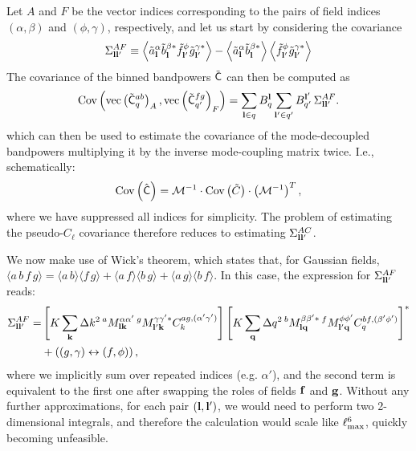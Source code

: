 \documentclass[a4paper,11pt]{article}
\newcommand{\summ}[1]{\sum_{\bf #1}\Delta #1^2}
\begin{document}
      Let $A$ and $F$ be the vector indices corresponding to the pairs of
      field indices $(\alpha,\beta)$ and $(\phi,\gamma)$, respectively, and let us start by considering the covariance
      \begin{equation}
        \Sigma^{AF}_{{\bf l}{\bf l}'}\equiv\left\langle\tilde{a}^\alpha_{\bf l}\tilde{b}^{\beta *}_{\bf l}\tilde{f}^\phi_{{\bf l}'}\tilde{g}^{\gamma *}_{{\bf l}'}\right\rangle-\left\langle\tilde{a}^\alpha_{\bf l}\tilde{b}^{\beta *}_{\bf l}\right\rangle\left\langle\tilde{f}^\phi_{{\bf l}'}\tilde{g}^{\gamma *}_{{\bf l}'}\right\rangle
      \end{equation}
      The covariance of the binned bandpowers $\tilde{\sf C}$ can then be computed as
      \begin{equation}\label{eq:cov_binned}
        {\rm Cov}\left({\rm vec}\left(\tilde{\sf C}^{ab}_q\right)_A,{\rm vec}\left(\tilde{\sf C}^{fg}_{q'}\right)_F\right)=\sum_{{\bf l}\in q} B^{\bf l}_q\sum_{{\bf l}'\in q'} B^{{\bf l}'}_{q'}\,\Sigma^{AF}_{{\bf l}{\bf l}'}.
      \end{equation}
      which can then be used to estimate the covariance of the mode-decoupled bandpowers multiplying it by the inverse mode-coupling matrix twice. I.e., schematically:
      \begin{equation}
        {\rm Cov}\left(\hat{\sf C}\right)=\mathcal{M}^{-1}\cdot{\rm Cov}\left(\tilde{C}\right)\cdot\left(\mathcal{M}^{-1}\right)^{T},
      \end{equation}
      where we have suppressed all indices for simplicity. The problem of estimating the pseudo-$C_\ell$ covariance therefore reduces to estimating $\Sigma^{AC}_{{\bf l}{\bf l}'}$.
    
      We now make use of Wick's theorem, which states that, for Gaussian fields, $\langle a\,b\,f\,g\rangle=\langle a\,b\rangle\langle f\,g\rangle+\langle a\,f\rangle\langle b\,g\rangle+\langle a\,g\rangle\langle b\,f\rangle$. In this case, the expression for $\Sigma^{AF}_{{\bf l}{\bf l'}}$ reads:
      \begin{align}\nonumber
        \Sigma^{AF}_{{\bf l}{\bf l}'}=&\left[K\summ{k}\,^aM^{\alpha\alpha'}_{{\bf l}{\bf k}}\,^gM^{\gamma\gamma'*}_{{\bf l}'{\bf k}}C^{ag,(\alpha'\gamma')}_k\right]\left[K\summ{q}\,^bM^{\beta\beta'*}_{{\bf l}{\bf q}}\,^fM^{\phi\phi'}_{{\bf l}'{\bf q}}C^{bf,(\beta'\phi')}_q\right]^*\\\label{eq:covar_general}
        &+\left((g,\gamma)\leftrightarrow(f,\phi)\right),
      \end{align}
      where we implicitly sum over repeated indices (e.g. $\alpha'$), and the second term is equivalent to the first one after swapping the roles of fields ${\bf f}$ and ${\bf g}$. Without any further approximations, for each pair $({\bf l},{\bf l}')$, we would need to perform two 2-dimensional integrals, and therefore the calculation would scale like $\ell_{\rm max}^6$, quickly becoming unfeasible.
    
\end{document}
